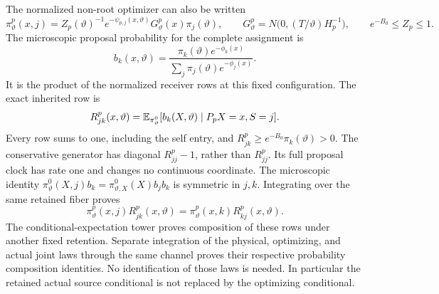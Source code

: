 The normalized non-root optimizer can also be written
\begin{equation}
 \pi_\vartheta^p(x,j)
 =Z_p(\vartheta)^{-1}e^{-\psi_{p,j}(x,\vartheta)}
       G_\vartheta^p(x)\pi_j(\vartheta),\qquad
 G_\vartheta^p=N\bigl(0,(T/\vartheta)H_p^{-1}\bigr),\qquad
 e^{-B_0}\le Z_p\le1.
 \label{eq:rg-formation-normalized-parent-proof}
\end{equation}
The microscopic proposal probability for the complete assignment is
\begin{equation}
 b_k(x,\vartheta)
 =\frac{\pi_k(\vartheta)e^{-\phi_k(x)}}
        {\sum_j\pi_j(\vartheta)e^{-\phi_j(x)}}.
 \label{eq:rg-formation-full-source-row-proof}
\end{equation}
It is the product of the normalized receiver rows at this fixed
configuration. The exact inherited row is
\begin{equation}
 R^p_{jk}(x,\vartheta)
 =\mathbb E_{\pi_\vartheta^0}
       [b_k(X,\vartheta)\mid P_pX=x,S=j].
 \label{eq:rg-formation-inherited-row-proof}
\end{equation}
Every row sums to one, including the self entry, and
$R^p_{jk}\ge e^{-B_0}\pi_k(\vartheta)>0$. The conservative
generator has diagonal $R^p_{jj}-1$, rather than $R^p_{jj}$. Its full
proposal clock has rate one and changes no continuous coordinate.
The microscopic identity
$\pi_\vartheta^0(X,j)b_k=
\pi_{\vartheta,X}^0(X)b_jb_k$ is symmetric in $j,k$.
Integrating over the same retained fiber proves
\begin{equation}
 \pi_\vartheta^p(x,j)R^p_{jk}(x,\vartheta)
 =\pi_\vartheta^p(x,k)R^p_{kj}(x,\vartheta).
 \label{eq:rg-formation-parent-balance-proof}
\end{equation}
The conditional-expectation tower proves composition of these rows
under another fixed retention. Separate integration of the physical,
optimizing, and actual joint laws through the same channel proves
their respective probability composition identities. No identification
of those laws is needed. In particular the retained actual source
conditional is not replaced by the optimizing conditional.

